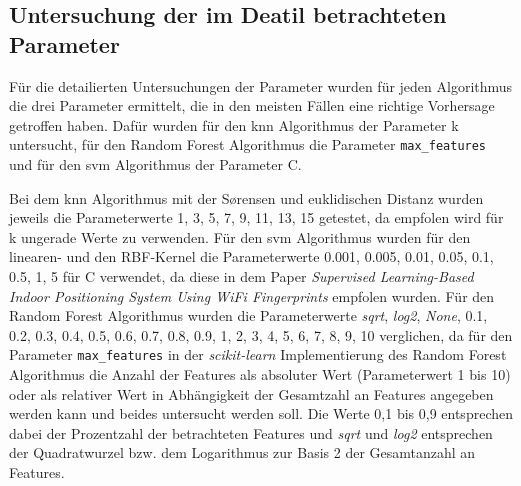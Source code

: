 \subsection{Untersuchung der im Deatil betrachteten Parameter}

Für die detailierten Untersuchungen der Parameter wurden für jeden Algorithmus die drei Parameter ermittelt, die in den meisten Fällen eine richtige Vorhersage getroffen haben. Dafür wurden für den \gls{knn} Algorithmus der Parameter k untersucht, für den Random Forest Algorithmus die Parameter \texttt{max\_features} und für den \gls{svm} Algorithmus der Parameter C. 


Bei dem \gls{knn} Algorithmus mit der Sørensen und euklidischen Distanz wurden jeweils die Parameterwerte 1, 3, 5, 7, 9, 11, 13, 15 getestet, da empfolen wird für k ungerade Werte zu verwenden. Für den \gls{svm} Algorithmus wurden für den linearen- und den RBF-Kernel die Parameterwerte  0.001, 0.005, 0.01, 0.05, 0.1, 0.5, 1, 5 für C verwendet, da diese in dem Paper \textit{Supervised Learning-Based Indoor Positioning System Using WiFi Fingerprints} empfolen wurden. Für den Random Forest Algorithmus wurden die Parameterwerte \textit{sqrt}, \textit{log2}, \textit{None}, 0.1, 0.2, 0.3, 0.4, 0.5, 0.6, 0.7, 0.8, 0.9, 1, 2, 3, 4, 5, 6, 7, 8, 9, 10 verglichen, da für den Parameter \texttt{max\_features} in der \textit{scikit-learn} Implementierung des Random Forest Algorithmus die Anzahl der Features als absoluter Wert (Parameterwert 1 bis 10) oder als relativer Wert in Abhängigkeit der Gesamtzahl an Features angegeben werden kann und beides untersucht werden soll. Die Werte 0,1 bis 0,9 entsprechen dabei der Prozentzahl der betrachteten Features und \textit{sqrt} und \textit{log2} entsprechen der Quadratwurzel bzw. dem Logarithmus zur Basis 2 der Gesamtanzahl an Features.




